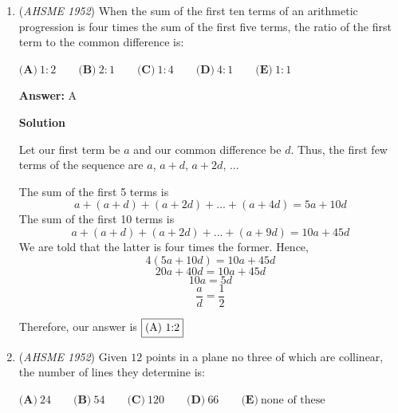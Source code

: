 \begin{enumerate}
 $\textbf{(A)}\ 1.25, 8.75  \qquad \textbf{(B)}\ 2.75, 7.25\qquad \textbf{(C)}\ 2,8 \qquad \textbf{(D)} \ 4,6 \qquad \textbf{(E)} \text{None of these}$

 \textbf{Answer: }A



\textbf{Solution}

Let the intersection of $CH$ and $AB$ be $N$, $O$ be the center of the circle, $ON = a$ and $CN = x$. By power of a point on $N$, we have
 \[(5+a)(5-a) = 25-a^2 = x(8-x).\]$\triangle CON$ is a right triangle, so we also know that $x^2 = a^2 + 25$, thus
 \[25 - a^2 = 25-(x^2-25) = 50-x^2 = 8x-x^2 \Rightarrow x = \frac{50}{8} = \frac{25}{4}.\]It follows that $a = \sqrt{x^2 - 25} = 5\sqrt{\frac{25}{16}-1} = \frac{15}{4}$.

 $BN = 5 + \frac{15}{14} = 8.75$, so the answer is $A$.

 


	\item (\textit{AHSME 1952}) When the sum of the first ten terms of an arithmetic progression is four times the sum of the first five terms, the ratio of the first term to the common difference is: 


 $\textbf{(A)}\ 1: 2 \qquad \textbf{(B)}\ 2: 1 \qquad \textbf{(C)}\ 1: 4 \qquad \textbf{(D)}\ 4: 1 \qquad \textbf{(E)}\ 1: 1$

 \textbf{Answer: }A



\textbf{Solution}

Let our first term be $a$ and our common difference be $d$. Thus, the first few terms of the sequence are $a$, $a + d$, $a + 2d$, ...

 The sum of the first 5 terms is
 \[a + (a + d) + (a + 2d) + ...  + (a + 4d) = 5a + 10d\]The sum of the first 10 terms is 
 \[a + (a + d) + (a + 2d) + ... + (a + 9d) = 10a + 45d\]We are told that the latter is four times the former. Hence, 
 \[4(5a + 10d) = 10a + 45d\]
 \[20a + 40d = 10a + 45d\]
 \[10a = 5d\]
 \[\frac{a}{d}  = \frac{1}{2}\]

 Therefore, our answer is $\fbox{(A) 1:2}$



	\item (\textit{AHSME 1952}) Given $12$ points in a plane no three of which are collinear, the number of lines they determine is: 


 $\textbf{(A)}\ 24 \qquad \textbf{(B)}\ 54 \qquad \textbf{(C)}\ 120 \qquad \textbf{(D)}\ 66 \qquad \textbf{(E)}\ \text{none of these}$


\end{enumerate}
